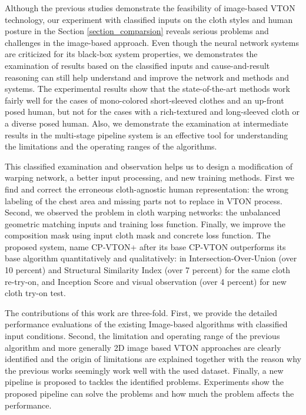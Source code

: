 Although the previous studies demonstrate the feasibility of image-based VTON technology, our experiment with classified inputs on the cloth styles and human posture in the Section \ref{section_comparsion} reveals serious problems and challenges in the image-based approach. 
Even though the neural network systems are criticized for its black-box system properties, 
we demonstrates the examination of results based on the classified inputs and  cause-and-result reasoning can still help understand and improve the network and methods and systems. The experimental results show that the state-of-the-art methods work fairly well for the cases of  mono-colored short-sleeved clothes and an up-front posed human, but not for the cases with a rich-textured and long-sleeved cloth or a diverse posed human.    
Also, we demonstrate the examination at intermediate results in the multi-stage pipeline system is an effective tool for understanding the limitations and the operating ranges of the algorithms. 

This classified examination and observation helps us to design a modification of warping network, a better input processing, and new training methods. First we find and correct the erroneous cloth-agnostic human representation: the wrong labeling of the chest area and missing parts not to replace in VTON process. Second, we observed the problem in cloth warping networks: the unbalanced geometric matching inputs and training loss function. Finally, we improve the composition mask using input cloth mask and concrete loss function.   The proposed system, name CP-VTON+ after its base CP-VTON outperforms its base algorithm quantitatively and qualitatively: in Intersection-Over-Union (over 10 percent) and Structural Similarity Index (over 7 percent) for the same cloth re-try-on, and Inception Score and visual observation (over 4 percent) for new cloth try-on test. 

The contributions of this work are three-fold. First, we provide the detailed performance evaluations of the existing Image-based algorithms with classified input conditions. Second, the limitation and operating range of the previous algorithm and more generally 2D image based VTON approaches are clearly identified and the origin of limitations are explained together with  the reason why the previous works seemingly work well with the used dataset. Finally, a new pipeline is proposed to tackles the identified problems. Experiments show the proposed pipeline can solve the problems and how much the problem affects the performance. 

